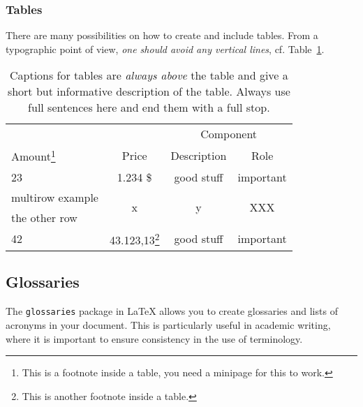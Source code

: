 
\subsubsection{Tables}

There are many possibilities on how to create and include tables. From a typographic point of view, \textit{one should avoid any vertical lines}, cf. Table~\ref{tab1}.


\begin{table}[htbp]
	\centering
	\begin{minipage}{\textwidth} %
	\renewcommand{\footnoterule}{}
 	\renewcommand{\thefootnote}{\alph{footnote}}
	\centering
	\caption[This is the short caption for the \textit{List of Tables}.]{Captions for tables are \emph{always above} the table and give a short but informative description of the table. Always use full sentences here and end them with a full stop.}
	\label{tab1}
	\begin{tabular}{@{}lccc@{}} \toprule
	& & \multicolumn{2}{c}{Component}\\
	\cmidrule{3-4}
	Amount\footnote{This is a footnote inside a table, you need a minipage for this to work.} & Price & Description & Role \\
	\midrule
	23 & 1.234 \$ & good stuff & important\\
	\midrule
	multirow example & \multirow{2}{*}{x} & \multirow{2}{*}{y} & \multirow{2}{*}{XXX} \\
	the other row & & &\\
	\midrule
	42 & 43.123,13\footnote{This is another footnote inside a table.} & good stuff & important\\
	\bottomrule
	\end{tabular}
	\end{minipage}
\end{table}

\subsection{Glossaries}

The \texttt{glossaries} package in LaTeX allows you to create glossaries and lists of acronyms in your document. This is particularly useful in academic writing, where it is important to ensure consistency in the use of terminology.

